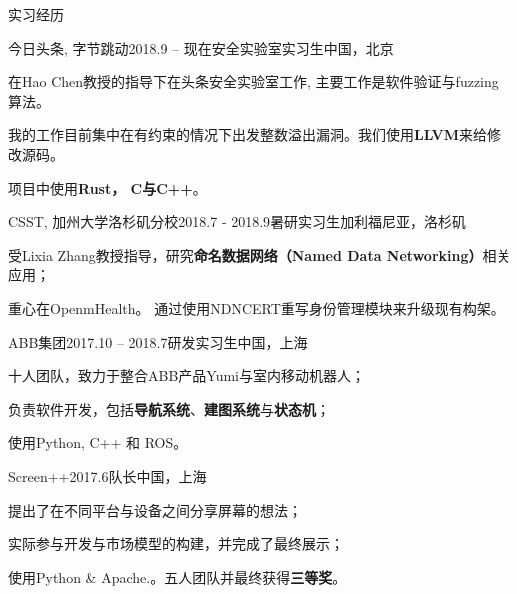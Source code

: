 \documentclass{resume} %
\begin{document}
\begin{rSection}{实习经历}

\begin{rSubsection}
  {今日头条, 字节跳动}{2018.9 – 现在}{安全实验室实习生}{中国，北京}
    \item 在Hao Chen教授的指导下在头条安全实验室工作, 主要工作是软件验证与fuzzing算法。
    \item 我的工作目前集中在有约束的情况下出发整数溢出漏洞。我们使用\textbf{LLVM}来给修改源码。
    \item 项目中使用\textbf{Rust， C与C++}。
\end{rSubsection}


\begin{rSubsection}
  {CSST, 加州大学洛杉矶分校}{2018.7 - 2018.9}{暑研实习生}{加利福尼亚，洛杉矶}
    \item 受Lixia Zhang教授指导，研究\textbf{命名数据网络（Named Data Networking）}相关应用；
    \item 重心在OpenmHealth。 通过使用NDNCERT重写身份管理模块来升级现有构架。
\end{rSubsection}


\begin{rSubsection}
  {ABB集团}{2017.10 – 2018.7}{研发实习生}{中国，上海}
    \item 十人团队，致力于整合ABB产品Yumi与室内移动机器人；
    \item 负责软件开发，包括\textbf{导航系统}、\textbf{建图系统}与\textbf{状态机}；
    \item 使用Python, C++ 和 ROS。
\end{rSubsection}


\begin{rSubsection}
  {Screen++}{2017.6}{队长}{中国，上海}
    \item 提出了在不同平台与设备之间分享屏幕的想法；
    \item 实际参与开发与市场模型的构建，并完成了最终展示；
    \item 使用Python \& Apache.。五人团队并最终获得\textbf{三等奖}。
\end{rSubsection}

\end{rSection}
\end{document}
